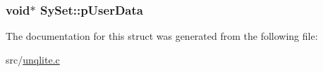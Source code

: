 \hypertarget{struct_sy_set_a898dab8865ebb7bd594044d377fb8377}{
\subsubsection[{p\-User\-Data}]{\setlength{\rightskip}{0pt plus 5cm}void$\ast$ Sy\-Set\-::p\-User\-Data}}\label{da/d82/struct_sy_set_a898dab8865ebb7bd594044d377fb8377}


The documentation for this struct was generated from the following file\-:\begin{DoxyCompactItemize}
\item 
src/\hyperlink{unqlite_8c}{unqlite.\-c}\end{DoxyCompactItemize}
